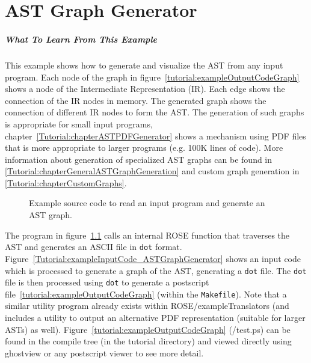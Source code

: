 \chapter{AST Graph Generator}
\label{Tutorial:chapterASTGraphGenerator}

\paragraph{What To Learn From This Example}
This example shows how to generate and visualize the AST from any input program.
Each node of the graph in figure~\ref{tutorial:exampleOutputCodeGraph} shows
a node of the Intermediate Representation (IR).  Each edge shows the connection
of the IR nodes in memory. The generated graph shows the connection of different 
IR nodes to form the AST.  The generation of such graphs is appropriate for small 
input programs, chapter~\ref{Tutorial:chapterASTPDFGenerator} shows a mechanism 
using PDF files that is more appropriate to larger programs (e.g. 100K lines of code).
More information about generation of specialized AST graphs can be found in 
\ref{Tutorial:chapterGeneralASTGraphGeneration} and custom graph generation in
\ref{Tutorial:chapterCustomGraphs}.

\begin{figure}[!h]
{\indent
{\mySmallFontSize


\begin{latexonly}
   
\end{latexonly}

\begin{htmlonly}
   
\end{htmlonly}

}
}
\caption{Example source code to read an input program and generate an AST graph.}
\label{Tutorial:exampleASTGraphGenerator}
\end{figure}

The program in figure~\ref{Tutorial:exampleASTGraphGenerator} calls 
an internal ROSE function that traverses the AST and generates 
an ASCII file in {\tt dot} format.
Figure~\ref{Tutorial:exampleInputCode_ASTGraphGenerator} shows an input
code which is processed to generate a graph of the AST, generating a 
{\tt dot} file.   The {\tt dot} file is then processed
using {\tt dot} to generate a postscript file~\ref{tutorial:exampleOutputCodeGraph}
(within the {\tt Makefile}).
Note that a similar utility program already exists within ROSE/exampleTranslators
(and includes a utility to output an alternative PDF representation 
(suitable for larger ASTs) as well).  Figure~\ref{tutorial:exampleOutputCodeGraph}
(\TutorialExampleBuildDirectory/test.ps) can be found in the compile 
tree (in the tutorial directory) and viewed directly using ghostview 
or any postscript viewer to see more detail.


